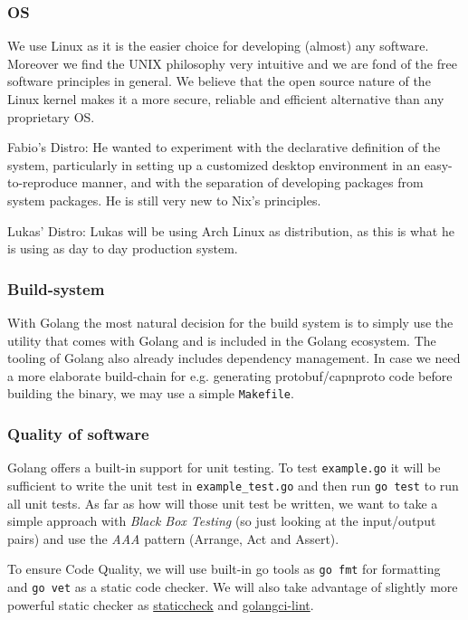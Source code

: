 \documentclass[a4paper,english,10pt,NET]{tumarticle}
\renewcommand{\eg}{e.g.\xspace} %
\begin{document}
\subsubsection{OS}
We use Linux as it is the easier choice for developing (almost) any software. Moreover we find the UNIX philosophy very intuitive and we are fond of the free software principles in general. We believe that the open source nature of the Linux kernel makes it a more secure, reliable and efficient alternative than any proprietary OS.

Fabio's Distro:
He wanted to experiment with the declarative definition of the system, particularly in setting up a customized desktop environment in an easy-to-reproduce manner, and with the separation of developing packages from system packages. He is still very new to Nix's principles.

Lukas' Distro:
Lukas will be using Arch Linux as distribution, as this is what he is using as day to day production system.


\subsubsection{Build-system}
With Golang the most natural decision for the build system is to simply use the utility that comes with Golang and is included in the Golang ecosystem.
The tooling of Golang also already includes dependency management.
In case we need a more elaborate build-chain for \eg generating protobuf/capnproto code before building the binary, we may use a simple \texttt{Makefile}.

\subsubsection{Quality of software}

Golang offers a built-in support for unit testing. To test \verb|example.go| it will be sufficient to write the unit test in \verb|example_test.go| and then run \verb|go test| to run all unit tests. As far as how will those unit test be written, we want to take a simple approach with \textit{Black Box Testing} (so just looking at the input/output pairs) and use the \textit{AAA} pattern (Arrange, Act and Assert).

To ensure Code Quality, we will use built-in go tools as \verb|go fmt| for formatting and \verb|go vet| as a static code checker. We will also take advantage of slightly more powerful static checker as \href{https://staticcheck.dev/}{staticcheck} and \href{https://github.com/golangci/golangci-lint}{golangci-lint}.
\end{document}
